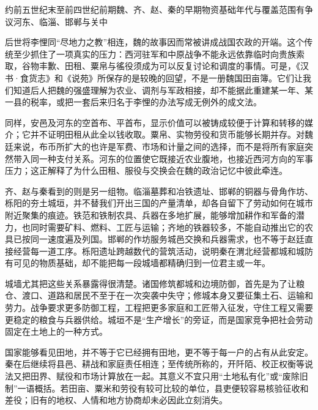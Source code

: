 \begin{event}{约前五世纪末至前四世纪前期}{魏、齐、赵、秦的早期物资基础}{年代与覆盖范围有争议}{河东、临淄、邯郸与关中}

后世将李悝同“尽地力之教”相连，魏的故事因而常被讲成战国农政的开端。这个传统至少抓住了一项真实的压力：西河驻军和中原战争不能永远依靠临时向贵族索取，谷物丰歉、田租、粟帛与徭役须成为可以反复讨论和调度的事情。可是，《汉书·食货志》和《说苑》所保存的是较晚的回望，不是一册魏国田亩簿。它们让我们知道后人把魏的强盛理解为农业、调剂与军政相接，却不能据此重建某一年、某一县的税率，或把一套后来归名于李悝的办法写成无例外的成文法。

同样，安邑及河东的空首布、平首布，显示价值可以被铸成较便于计算和转移的媒介；它并不证明田租从此全以钱收取。粟帛、实物劳役和货币能够长期并存。对魏廷来说，布币所扩大的也许是军费、市场和计量之间的选择，而不是将所有家庭突然带入同一种支付关系。河东的位置使它既接近农业腹地，也接近西河方向的军事压力；这正解释了为什么田租、服役与交换会在魏的政治记忆中彼此牵连。

齐、赵与秦看到的则是另一组物。临淄墓葬和冶铁遗址、邯郸的铜器与骨角作坊、栎阳的夯土城垣，并不替我们开出三国的产量清单，却各自留下了劳动如何在城市附近聚集的痕迹。铁范和铁制农具、兵器在多地扩展，能够增加耕作和军备的潜力，也同时需要矿料、燃料、工匠与运输；齐地的铁器较多，不能自动推出它的农具已按同一速度遍及列国。邯郸的作坊服务城邑交换和兵器需求，也不等于赵廷直接经营每一道工序。栎阳遗址跨越数代的营筑活动，说明秦在渭北经营都城和城防有可见的物质基础，却不能把每一段城墙都精确归到一位君主或一年。

城墙尤其把这些关系暴露得很清楚。诸国修筑都城和边境防御，首先是为了让粮仓、渡口、道路和居民不至于在一次突袭中失守；修城本身又要征集土石、运输和劳力。战争要求更多防御工程，工程把更多家庭和工匠带入征发，守住工程又需要更稳定的粮食与兵器供给。城垣不是“生产增长”的旁证，而是国家竞争把社会劳动固定在土地上的一种方式。
\end{event}

国家能够看见田地，并不等于它已经拥有田地，更不等于每一户的占有从此安定。秦在后继续将县邑、耕战和家庭责任相连；至传统所称的，开阡陌、校正权衡等说法又把田界、赋役和市场计算放在一起。其意义不宜只用“土地私有化”或“废除旧制”一语概括。若田亩、粟米和劳役有较可比较的单位，县吏便较容易核验征收和差役；旧有的地权、人情和地方协商却未必因此立刻消失。

